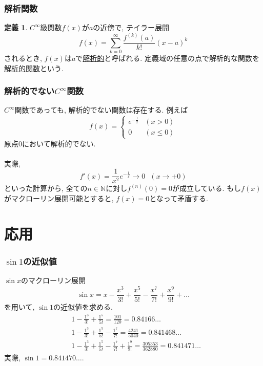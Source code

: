 \documentclass[dvipdfmx,cjk,10.2pt]{beamer}
\newcommand{\N}{\mathbb{N}}
\theoremstyle{definition}
\newtheorem{Def}[Thm]{定義}
\begin{document}
\begin{frame}
\frametitle{解析関数}

\begin{Def}
$C^\infty$級関数$f(x)$が$a$の近傍で, テイラー展開
$$
f(x) = \sum_{k=0}^{\infty}\frac{f^{(k)}(a)}{k!}(x-a)^k 
$$
されるとき, $f(x)$は$a$で\underline{解析的}と呼ばれる. 定義域の任意の点で解析的な関数を\underline{解析的関数}という. 
\end{Def}

\end{frame}





\begin{frame}
\frametitle{解析的でない$C^\infty$関数}


$C^\infty$関数であっても, 解析的でない関数は存在する. 例えば
$$
f(x) = 
\begin{cases}
e^{-\frac{1}{x}}  & (x>0) \\
0 & (x \le 0) 
 \end{cases}
$$
原点$0$において解析的でない. \\
\ \\

実際, 
$$
f'(x)=\frac{1}{x^2}e^{-\frac{1}{x}} \longrightarrow 0 \ \ \ (x \to +0)
$$
といった計算から, 全ての$n \in \N$に対し$f^{(n)}(0)=0$が成立している. 
もし$f(x)$がマクローリン展開可能とすると, $f(x)=0$となって矛盾する. 
\end{frame}





\section{応用}

\begin{frame}
\frametitle{$\sin 1$の近似値}

$\sin x$のマクローリン展開 
$$
\sin x = x-\frac{x^3}{3!}+\frac{x^5}{5!}-\frac{x^7}{7!}+\frac{x^9}{9!}+\dots 
$$
を用いて, $\sin 1$の近似値を求める. 
\begin{align*}
& 1-\frac{1^3}{3!}+\frac{1^5}{5!} = \frac{101}{120}=0.84166\dots \\
& 1-\frac{1^3}{3!}+\frac{1^5}{5!}-\frac{1^7}{7!} = \frac{4241}{5040}=0.841468\dots \\
& 1-\frac{1^3}{3!}+\frac{1^5}{5!}-\frac{1^7}{7!}+\frac{1^9}{9!} = \frac{305353}{362880}=0.841471\dots
\end{align*}
実際, $\sin 1 = 0.841470\dots$. 
\end{frame}
\end{document}
